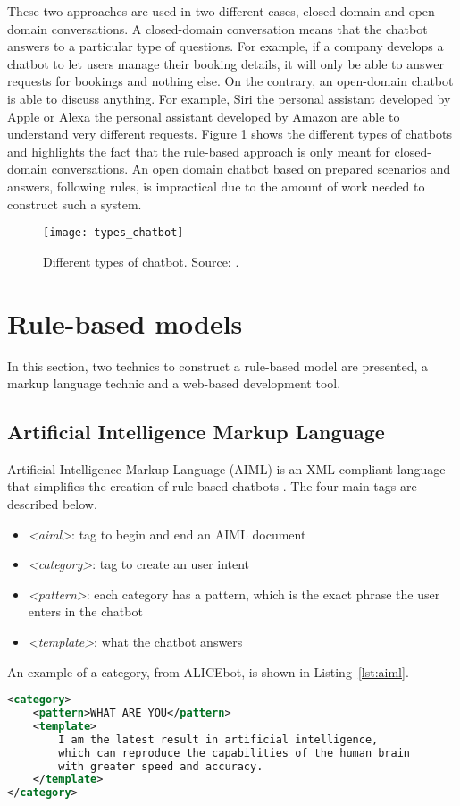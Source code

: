 These two approaches are used in two different cases, closed-domain and open-domain conversations. A closed-domain conversation means that the chatbot answers to a particular type of questions. For example, if a company develops a chatbot to let users manage their booking details, it will only be able to answer requests for bookings and nothing else. On the contrary, an open-domain chatbot is able to discuss anything. For example, Siri the personal assistant developed by Apple or Alexa the personal assistant developed by Amazon are able to understand very different requests. Figure \ref{fig:types_chatbot} shows the different types of chatbots and highlights the fact that the rule-based approach is only meant for closed-domain conversations. An open domain chatbot based on prepared scenarios and answers, following rules, is impractical due to the amount of work needed to construct such a system.

\begin{figure}
    \centering
    \texttt{[image: types\_chatbot]}
    \decoRule
    \caption[Different types of chatbot]{Different types of chatbot. Source: \citet{types-chatbot}.}
    \label{fig:types_chatbot}
\end{figure}

\section{Rule-based models}
In this section, two technics to construct a rule-based model are presented, a markup language technic and a web-based development tool.

\subsection{Artificial Intelligence Markup Language}
Artificial Intelligence Markup Language (AIML) is an XML-compliant language that simplifies the creation of rule-based chatbots \citep{wallace2005aiml}. The four main tags are described below.
\begin{itemize}
    \item \textit{<aiml>}: tag to begin and end an AIML document
    \item \textit{<category>}: tag to create an user intent
    \item \textit{<pattern>}: each category has a pattern, which is the exact phrase the user enters in the chatbot
    \item \textit{<template>}: what the chatbot answers
\end{itemize}
An example of a category, from ALICEbot, is shown in Listing~\ref{lst:aiml}.
\begin{lstlisting}[caption={Example of anonymization}, language=XML, label={lst:aiml}]
<category>
    <pattern>WHAT ARE YOU</pattern>
    <template>
        I am the latest result in artificial intelligence,
        which can reproduce the capabilities of the human brain
        with greater speed and accuracy.
    </template>
</category>
\end{lstlisting}

